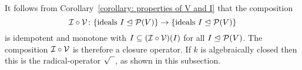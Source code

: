 \begin{remark}
  It follows from Corollary~\ref{corollary: properties of V and I} that the composition
  \[
            \mathcal{I} \circ \mathcal{V}
    \colon  \{ \text{ideals $I \trianglelefteq \mathcal{P}(V)$} \}
    \to     \{ \text{ideals $I \trianglelefteq \mathcal{P}(V)$} \}
  \]
  is idempotent and monotone with $I \subseteq (\mathcal{I} \circ \mathcal{V})(I)$ for all $I \trianglelefteq \mathcal{P}(V)$.
  The composition $\mathcal{I} \circ \mathcal{V}$ is therefore a closure operator.
  If $k$ is algebraically closed then this is the radical-operator $\sqrt{\phantom{I}}$, as shown in this subsection.
\end{remark}


%   
%   
